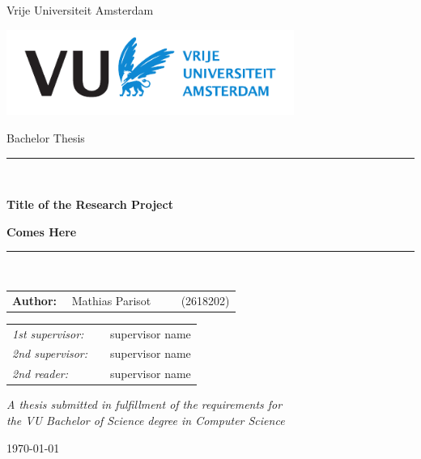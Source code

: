 \documentclass[11pt]{article}
\begin{document}
\thispagestyle{empty}

\begin{center}

Vrije Universiteit Amsterdam

\vspace{1mm}

\includegraphics[height=28mm]{vu-griffioen-white.pdf}

\vspace{1.5cm}

{\Large Bachelor Thesis}

\vspace*{1.5cm}

\rule{.9\linewidth}{.6pt}\\[0.4cm]
{\huge \bfseries Title of the Research Project\par}
{\huge \bfseries Comes Here\par}\vspace{0.4cm}
\rule{.9\linewidth}{.6pt}\\[1.5cm]

\vspace*{2mm}

{\Large
\begin{tabular}{l}
{\bf Author:} ~~Mathias Parisot ~~~~ (2618202)
\end{tabular}
}

\vspace*{1.5cm}

\begin{tabular}{ll}
{\it 1st supervisor:}   & ~~supervisor name \\
{\it 2nd supervisor:} & ~~supervisor name \\
{\it 2nd reader:}       & ~~supervisor name
\end{tabular}

\vspace*{2cm}

\textit{A thesis submitted in fulfillment of the requirements for\\ the VU Bachelor of Science degree in Computer Science }

\vspace*{1cm}

\today\\[4cm] %

\end{center}
\end{document}

